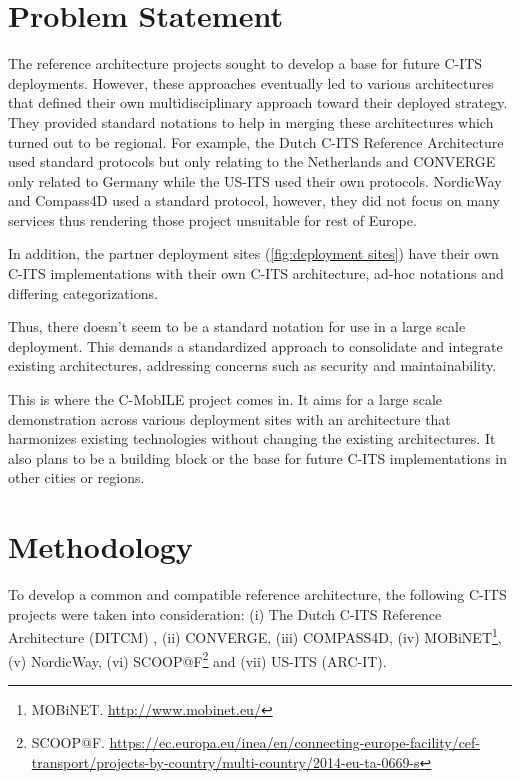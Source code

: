 \documentclass[conference]{IEEEtran}
\begin{document}
\section{Problem Statement}
The reference architecture projects sought to develop a base for future C-ITS deployments. However, these approaches eventually led to various architectures that defined their own multidisciplinary approach toward their deployed strategy. They provided standard notations to help in merging these architectures which turned out to be regional. For example, the Dutch C-ITS Reference Architecture used standard protocols but only relating to the Netherlands and CONVERGE only related to Germany while the US-ITS used their own protocols. NordicWay and Compass4D used a standard protocol, however, they did not focus on many services thus rendering those project unsuitable for rest of Europe.

In addition, the partner deployment sites (\ref{fig:deployment sites}) have their own C-ITS implementations with their own C-ITS architecture, ad-hoc notations and differing categorizations.

Thus, there doesn't seem to be a standard notation for use in a large scale deployment. This demands a standardized approach to consolidate and integrate existing architectures, addressing concerns such as security and maintainability.

This is where the C-MobILE project comes in. It aims for a large scale demonstration across various deployment sites with an architecture that harmonizes existing technologies without changing the existing architectures. It also plans to be a building block or the base for future C-ITS implementations in other cities or regions.




\section{Methodology}

 
To develop a common and compatible reference architecture, the following C-ITS projects were taken into consideration: (i) The Dutch C-ITS Reference Architecture (DITCM) \cite{ditcm}\cite{ditcmits}, (ii) CONVERGE\footnotemark[\ref{converge}], (iii) COMPASS4D\footnotemark[\ref{compass4d}], (iv) MOBiNET\footnote{\label{mobinet}MOBiNET. \url{http://www.mobinet.eu/}}, (v) NordicWay\footnotemark[\ref{nordicway}], (vi) SCOOP@F\footnote{SCOOP@F. \url{https://ec.europa.eu/inea/en/connecting-europe-facility/cef-transport/projects-by-country/multi-country/2014-eu-ta-0669-s}} and (vii) US-ITS (ARC-IT)\footnotemark[\ref{arcit}].
\end{document}
